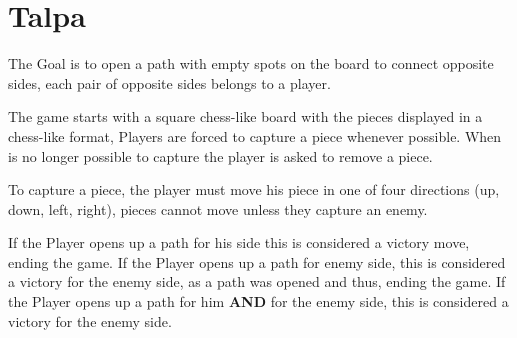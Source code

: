 \section{Talpa}
\noindent The Goal is to open a path with empty spots on the board to connect opposite sides,
each pair of opposite sides belongs to a player.

\noindent The game starts with a square chess-like board with the pieces displayed in a chess-like format,
Players are forced to capture a piece whenever possible.
When is no longer possible to capture the player is asked to remove a piece.

\noindent To capture a piece, the player must move his piece in one of four directions (up, down, left, right),
pieces cannot move unless they capture an enemy.

\noindent If the Player opens up a path for his side this is considered a victory move, ending the game.
If the Player opens up a path for enemy side, this is considered a victory for the enemy side, as a path
was opened and thus, ending the game.
If the Player opens up a path for him \textbf{AND} for the enemy side, this is considered a victory for the enemy side.